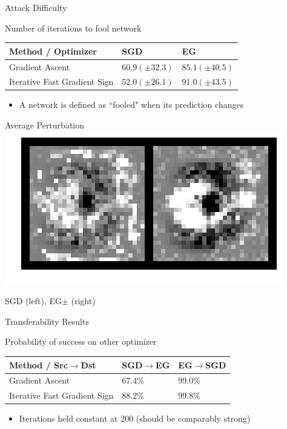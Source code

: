 \documentclass{beamer}
\begin{document}
	\begin{frame}{Attack Difficulty}
		\begin{block}{Number of iterations to fool network}
			\begin{center}
				\begin{tabular}{ l | l | l }
					Method / Optimizer & SGD & EG \\ \hline
					Gradient Ascent & $60.9 (\pm 32.3)$ & $85.1 (\pm 40.5)$ \\ \hline
					Iterative Fast Gradient Sign & $52.0 (\pm 26.1)$ & $91.0 (\pm 43.5)$
				\end{tabular}
			\end{center}
		\end{block}
		\begin{itemize}
			\item A network is defined as ``fooled" when its prediction changes
		\end{itemize}
	\end{frame}
	
	\begin{frame}{Average Perturbation}
		\centering
		\includegraphics[width=\textwidth]{avg_attack_3}
		
		SGD (left), EG$\pm$ (right)
	\end{frame}
	
	\begin{frame}{Transferability Results}
		\begin{block}{Probability of success on other optimizer}
			\begin{center}
				\begin{tabular}{ l | l | l }
					Method / Src$\rightarrow$Dst & SGD$\rightarrow$EG & EG$\rightarrow$SGD  \\ \hline
					Gradient Ascent & 67.4\% & 99.0\% \\ \hline
					Iterative Fast Gradient Sign & 88.2\% & 99.8\%
				\end{tabular}
			\end{center}
		\end{block}
		\begin{itemize}
			\item Iterations held constant at 200 (should be comparably strong)
		\end{itemize}
	\end{frame}
	
\end{document}
